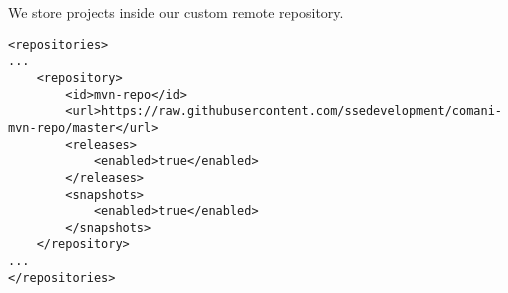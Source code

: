 \begin{enumerate}
		We store \thetool{} projects inside our custom remote repository. 
		\begin{lstlisting}
<repositories>
...
	<repository>
		<id>mvn-repo</id>
		<url>https://raw.githubusercontent.com/ssedevelopment/comani-mvn-repo/master</url>
		<releases>
			<enabled>true</enabled>
		</releases>
		<snapshots>
			<enabled>true</enabled>
		</snapshots>
	</repository>
...
</repositories>
		\end{lstlisting}
\end{enumerate}

